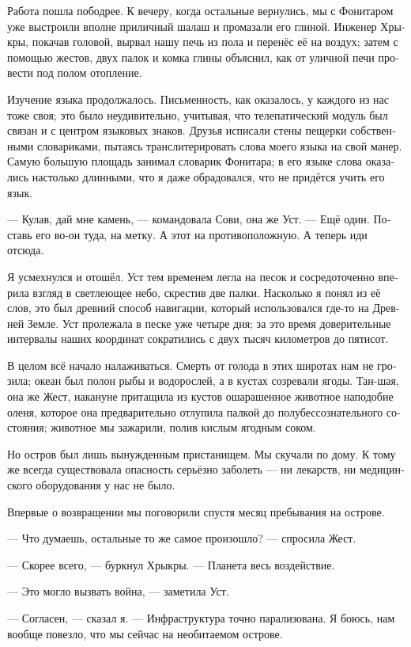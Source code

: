 \documentclass[a4paper,10pt,fleqn]{book}\usepackage{polyglossia}\setdefaultlanguage[babelshorthands=true]{russian}\setotherlanguage{english}\defaultfontfeatures{Ligatures=TeX,Mapping=tex-text}
\newcommand{\asterism}{\vspace{1em}{\centering\Large\bfseries$\ast~\ast~\ast$\par}\vspace{1em}}
\begin{document}
Работа пошла пободрее.
К вечеру, когда остальные вернулись, мы с Фонитаром уже выстроили вполне приличный шалаш и промазали его глиной.
Инженер Хрыкры, покачав головой, вырвал нашу печь из пола и перенёс её на воздух;
затем с помощью жестов, двух палок и комка глины объяснил, как от уличной печи провести под полом отопление.

Изучение языка продолжалось.
Письменность, как оказалось, у каждого из нас тоже своя;
это было неудивительно, учитывая, что телепатический модуль был связан и с центром языковых знаков.
Друзья исписали стены пещерки собственными словариками, пытаясь транслитерировать слова моего языка на свой манер.
Самую большую площадь занимал словарик Фонитара;
в его языке слова оказались настолько длинными, что я даже обрадовался, что не придётся учить его язык.

\asterism

--- Кулав, дай мне камень, --- командовала Сови, она же Уст.
--- Ещё один.
Поставь его во-он туда, на метку.
А этот на противоположную.
А теперь иди отсюда.

Я усмехнулся и отошёл.
Уст тем временем легла на песок и сосредоточенно вперила взгляд в светлеющее небо, скрестив две палки.
Насколько я понял из её слов, это был древний способ навигации, который использовался где-то на Древней Земле.
Уст пролежала в песке уже четыре дня;
за это время доверительные интервалы наших координат сократились с двух тысяч километров до пятисот.

В целом всё начало налаживаться.
Смерть от голода в этих широтах нам не грозила;
океан был полон рыбы и водорослей, а в кустах созревали ягоды.
Тан-шая, она же Жест, накануне притащила из кустов ошарашенное животное наподобие оленя, которое она предварительно отлупила палкой до полубессознательного состояния;
животное мы зажарили, полив кислым ягодным соком.

Но остров был лишь вынужденным пристанищем.
Мы скучали по дому.
К тому же всегда существовала опасность серьёзно заболеть --- ни лекарств, ни медицинского оборудования у нас не было.

Впервые о возвращении мы поговорили спустя месяц пребывания на острове.

--- Что думаешь, остальные то же самое произошло? --- спросила Жест.

--- Скорее всего, --- буркнул Хрыкры.
--- Планета весь воздействие.

--- Это могло вызвать война, --- заметила Уст.

--- Согласен, --- сказал я.
--- Инфраструктура точно парализована.
Я боюсь, нам вообще повезло, что мы сейчас на необитаемом острове.
\end{document}
